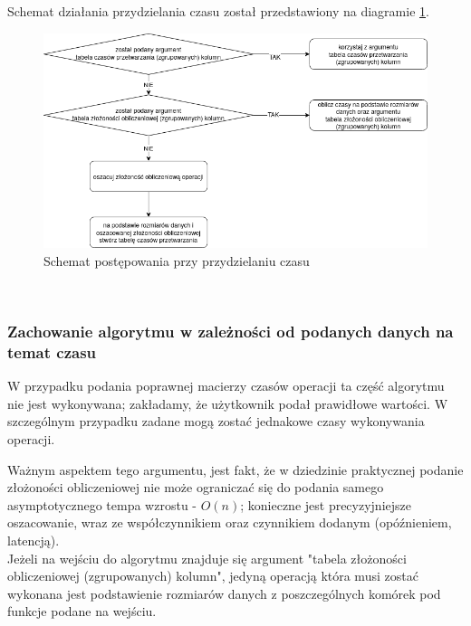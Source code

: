 \documentclass[brudnopis]{xmgr}
\begin{document}
Schemat działania przydzielania czasu został przedstawiony na diagramie \ref{diag:time-assign}.

\begin{figure}[!tbh]
\centering
\includegraphics[width=.8\hsize]{fig/przydzielanie_czasow.png}
\caption{Schemat postępowania przy przydzielaniu czasu\label{diag:time-assign}}
\end{figure}
\medskip\\

\subsubsection{Zachowanie algorytmu w zależności od podanych danych na temat czasu}


W przypadku podania poprawnej macierzy czasów operacji ta część algorytmu nie jest wykonywana; zakładamy, że użytkownik podał prawidłowe wartości.
W szczególnym przypadku zadane mogą zostać jednakowe czasy wykonywania operacji.


Ważnym aspektem tego argumentu, jest fakt, że w dziedzinie praktycznej podanie złożoności obliczeniowej nie może ograniczać się do podania samego asymptotycznego tempa wzrostu - $O(n)$; konieczne jest precyzyjniejsze oszacowanie, wraz ze współczynnikiem oraz czynnikiem dodanym (opóźnieniem, latencją).
\medskip\\

Jeżeli na wejściu do algorytmu znajduje się argument "tabela złożoności obliczeniowej (zgrupowanych) kolumn", jedyną operacją która musi zostać wykonana jest podstawienie rozmiarów danych z poszczególnych komórek pod funkcje podane na wejściu.
\medskip\\
\end{document}
